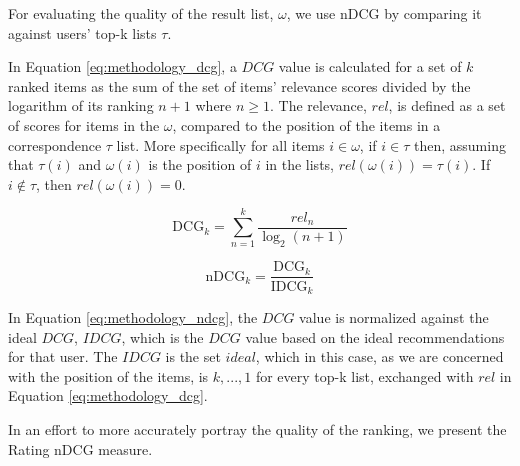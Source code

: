 \label{sec:methodology_ndcg}
For evaluating the quality of the result list, $\omega$, we use nDCG by comparing it against users' top-k lists $\tau$. 

In Equation \ref{eq:methodology_dcg}, a $DCG$ value is calculated for a set of $k$ ranked items as the sum of the set of items' relevance scores divided by the logarithm of its ranking $n + 1$ where $n \geq 1$. The relevance, $rel$, is defined as a set of scores for items in the $\omega$, compared to the position of the items in a correspondence $\tau$ list. More specifically for all items $i \in \omega$, if $i \in \tau$ then, assuming that $\tau(i)$ and $\omega(i)$ is the position of $i$ in the lists, $rel(\omega(i)) = \tau(i)$. If $i \notin \tau$, then $rel(\omega(i)) = 0$.


\begin{equation}\label{eq:methodology_dcg}
\text{DCG}_k = \sum_{n=1}^{k}\frac{\textit{rel}_n}{\log_2(n + 1)}
\end{equation}




\begin{equation}\label{eq:methodology_ndcg}
\text{nDCG}_k = \frac{\text{DCG}_k}{\text{IDCG}_k}
\end{equation}

In Equation \ref{eq:methodology_ndcg}, the $DCG$ value is normalized against the ideal $DCG$, $IDCG$, which is the $DCG$ value based on the ideal recommendations for that user. The $IDCG$ is the set $ideal$, which in this case, as we are concerned with the position of the items, is $k,...,1$ for every top-k list, exchanged with $rel$ in Equation \ref{eq:methodology_dcg}. 

In an effort to more accurately portray the quality of the ranking, we present the Rating nDCG measure.

